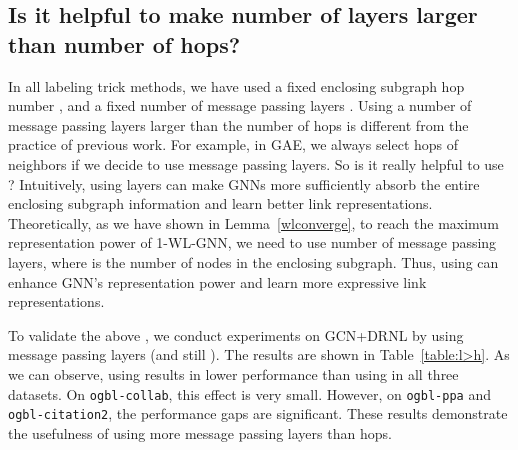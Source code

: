 \documentclass{article}
\begin{document}
\subsection{Is it helpful to make number of layers larger than number of hops?}
In all labeling trick methods, we have used a fixed enclosing subgraph hop number , and a fixed number of message passing layers . Using a number of message passing layers larger than the number of hops is different from the practice of previous work. For example, in GAE, we always select  hops of neighbors if we decide to use  message passing layers. So is it really helpful to use ? Intuitively, using  layers can make GNNs more sufficiently absorb the entire enclosing subgraph information and learn better link representations. Theoretically, as we have shown in Lemma~\ref{wlconverge}, to reach the maximum representation power of 1-WL-GNN, we need to use  number of message passing layers, where  is the number of nodes in the enclosing subgraph. Thus, using  can enhance GNN's representation power and learn more expressive link representations.

\begin{table}[h]
\caption{Ablation study on subgraph-level readout.}\label{table:l>h}
\begin{center}
\end{center}
\end{table}

To validate the above , we conduct experiments on GCN+DRNL by using  message passing layers (and still ). The results are shown in Table~\ref{table:l>h}. As we can observe, using  results in lower performance than using  in all three datasets. On \texttt{ogbl-collab}, this effect is very small. However, on \texttt{ogbl-ppa} and \texttt{ogbl-citation2}, the performance gaps are significant. These results demonstrate the usefulness of using more message passing layers than hops.
\end{document}
